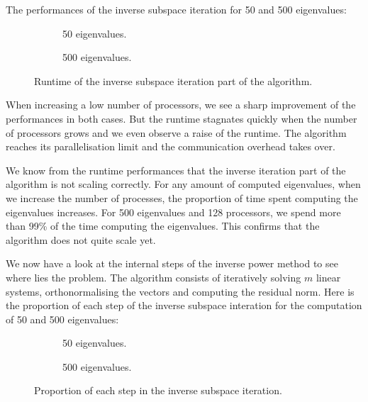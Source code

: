 The performances of the inverse subspace iteration for 50 and 500 eigenvalues:

\begin{figure}[H]
  \centering
  \begin{subfigure}[b]{0.5\textwidth}
   
   \caption{50 eigenvalues.}
  \end{subfigure}
  \begin{subfigure}[b]{0.45\textwidth}
   
   \caption{500 eigenvalues.}
  \end{subfigure}
  \caption{Runtime of the inverse subspace iteration part of the algorithm.}
\end{figure}

When increasing a low number of processors, we see a sharp improvement of the performances in both cases.
But the runtime stagnates quickly when the number of processors grows and we even observe a raise of the runtime.
The algorithm reaches its parallelisation limit and the communication overhead takes over.

We know from the runtime performances that the inverse iteration part of the algorithm is not scaling correctly.
For any amount of computed eigenvalues, when we increase the number of processes, the proportion of time spent computing the eigenvalues increases.
For 500 eigenvalues and 128 processors, we spend more than 99\% of the time computing the eigenvalues.
This confirms that the algorithm does not quite scale yet.

We now have a look at the internal steps of the inverse power method to see where lies the problem.
The algorithm consists of iteratively solving \(m\) linear systems, orthonormalising the vectors and computing the residual norm.
Here is the proportion of each step of the inverse subspace interation for the computation of 50 and 500 eigenvalues:

\begin{figure}[H]
  \centering
  \begin{subfigure}[b]{0.4\textwidth}
   
   \caption{50 eigenvalues.}
  \end{subfigure}
  \begin{subfigure}[b]{0.4\textwidth}
   
   \caption{500 eigenvalues.}
  \end{subfigure}
  \caption{Proportion of each step in the inverse subspace iteration.}
\end{figure}

